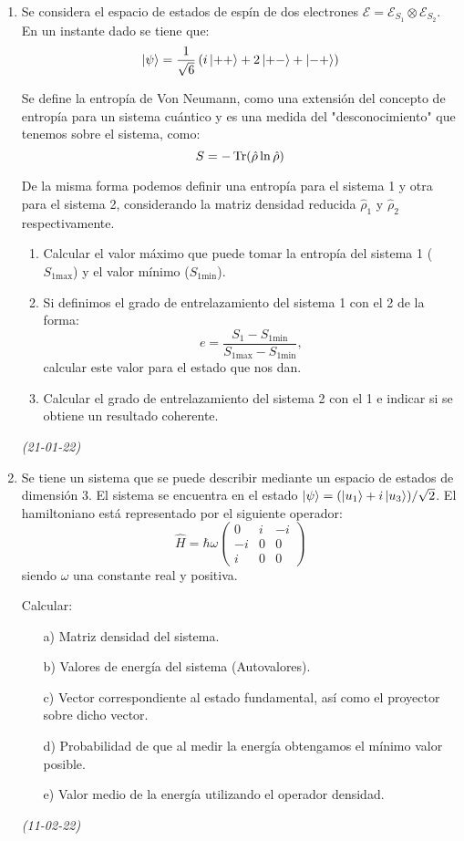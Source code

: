 \begin{enumerate}
    \item Se considera el espacio de estados de espín de dos electrones $\mathcal{E} = \mathcal{E}_{S_1} \otimes \mathcal{E}_{S_2}$. En un instante dado se tiene que:
    \[
    \ket{\psi} = \frac{1}{\sqrt{6}} \left( i \ket{++} + 2 \ket{+-} + \ket{-+} \right)
    \]
    
    Se define la entropía de Von Neumann, como una extensión del concepto de entropía para un sistema cuántico y es una medida del "desconocimiento" que tenemos sobre el sistema, como:
    \[
    S = -\Tr (\hat{\rho} \ln \hat{\rho})
    \]
    
    De la misma forma podemos definir una entropía para el sistema 1 y otra para el sistema 2, considerando la matriz densidad reducida $\hat{\rho}_1$ y $\hat{\rho}_2$ respectivamente.
    \begin{enumerate}
        \item Calcular el valor máximo que puede tomar la entropía del sistema 1 ($S_{1\text{max}}$) y el valor mínimo ($S_{1\text{min}}$).
        \item Si definimos el grado de entrelazamiento del sistema 1 con el 2 de la forma:
        \[
        e = \frac{S_1 - S_{1\text{min}}}{S_{1\text{max}} - S_{1\text{min}}},
        \]
        calcular este valor para el estado que nos dan.
        \item Calcular el grado de entrelazamiento del sistema 2 con el 1 e indicar si se obtiene un resultado coherente.
    \end{enumerate} \textit{(21-01-22)}

    \item Se tiene un sistema que se puede describir mediante un espacio de estados de dimensión 3. El sistema se encuentra en el estado $\ket{\psi} = (\ket{u_1} + i \ket{u_3}) / \sqrt{2}$. El hamiltoniano está representado por el siguiente operador:
    \[
    \hat{H} = \hbar \omega \begin{pmatrix} 0 & i & -i \\ -i & 0 & 0 \\ i & 0 & 0 \end{pmatrix}
    \]
    siendo $\omega$ una constante real y positiva.
    
    Calcular:
    \begin{enumerate}
        \item[a)] Matriz densidad del sistema.
        \item[b)] Valores de energía del sistema (Autovalores).
        \item[c)] Vector correspondiente al estado fundamental, así como el proyector sobre dicho vector.
        \item[d)] Probabilidad de que al medir la energía obtengamos el mínimo valor posible.
        \item[e)] Valor medio de la energía utilizando el operador densidad.
    \end{enumerate} \textit{(11-02-22)}


\end{enumerate}
